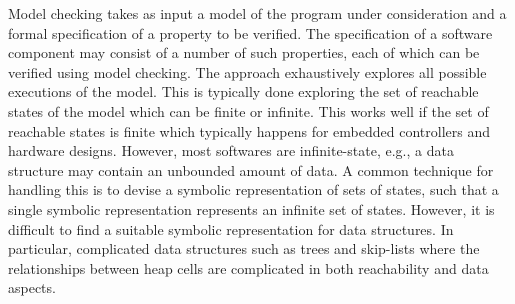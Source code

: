 Model checking takes as input a model of the program under
consideration and a formal specification of a property to be verified. The specification of a software component may consist of a number of such properties, each of which can be verified using model checking. The approach exhaustively explores all possible executions of the model. This is typically done exploring the set of reachable states of the model  which can be finite or infinite. 
This works well if the set of reachable states is finite which typically happens for embedded controllers and hardware designs. However, most softwares are infinite-state, e.g., a data structure may contain an unbounded amount of data. A common technique for handling this is to devise a symbolic representation of sets of states, such that a single symbolic representation represents an infinite set of states. 
However, it is difficult to find a suitable symbolic representation for data structures. In particular, complicated data structures such as trees and skip-lists where the relationships between heap cells are complicated in both reachability and data aspects.


